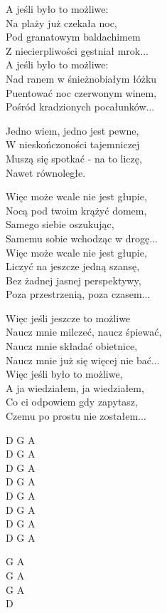 \begin{text}
A jeśli było to możliwe:\\
Na plaży już czekała noc,\\
Pod granatowym baldachimem\\
Z niecierpliwości gęstniał mrok...\\
A jeśli było to możliwe:\\
Nad ranem w śnieżnobiałym łóżku\\
Puentować noc czerwonym winem,\\
Pośród kradzionych pocałunków...

\vin Jedno wiem, jedno jest pewne,\\
\vin W nieskończoności tajemniczej\\
\vin Muszą się spotkać - na to liczę,\\
\vin Nawet równoległe.

Więc może wcale nie jest głupie,\\
Nocą pod twoim krążyć domem,\\
Samego siebie oszukując,\\
Samemu sobie wchodząc w drogę...\\
Więc może wcale nie jest głupie,\\
Liczyć na jeszcze jedną szansę,\\
Bez żadnej jasnej perspektywy,\\
Poza przestrzenią, poza czasem...

Więc jeśli jeszcze to możliwe\\
Naucz mnie milczeć, naucz śpiewać,\\
Naucz mnie składać obietnice,\\
Naucz mnie już się więcej nie bać...\\
Więc jeśli było to możliwe,\\
A ja wiedziałem, ja wiedziałem,\\
Co ci odpowiem gdy zapytasz,\\
Czemu po prostu nie zostałem...
\end{text}
\begin{chord}
    D G A\\
    D G A\\
    D G A\\
    D G A\\
    D G A\\
    D G A\\
    D G A\\
    D G A

    G A\\
    G A\\
    G A\\
    D
\end{chord}